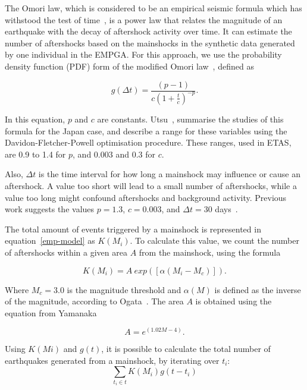 The Omori law, which is considered to be an empirical seismic formula
which has withstood the test of
time~\cite{utsu1995centenary,omori1895after}, is a power law that
relates the magnitude of an earthquake with the decay of aftershock
activity over time. It can estimate the number of aftershocks based on
the mainshocks in the synthetic data generated by one individual in
the EMPGA. For this approach, we use the probability density function
(PDF) form of the modified Omori law~\cite{zhuang2004analyzing},
defined as

\begin{equation}\label{omori}
  g(\Delta t)= \frac{(p-1)}{c(1+ \frac{t}{c})^{-p}}.
\end{equation}

In this equation, $p$ and $c$ are
constants. Utsu~\cite{utsu1995centenary}, summarise the studies of
this formula for the Japan case, and describe a range for these
variables using the Davidon-Fletcher-Powell optimisation
procedure. These ranges, used in ETAS, are 0.9 to 1.4 for $p$, and
0.003 and 0.3 for $c$.

Also, $\Delta t$ is the time interval for how long a mainshock may
influence or cause an aftershock. A value too short will lead to a
small number of aftershocks, while a value too long might confound
aftershocks and background activity. Previous work suggests the values
$p = 1.3$, $c = 0.003$, and $\Delta t = 30$
days~\cite{yamanaka1990scaling}.

The total amount of events triggered by a mainshock is represented in
equation~\ref{emp-model} as $K(M_i)$. To calculate this value,
we count the number of aftershocks within a given area $A$ from
the mainshock, using the formula

\begin{equation}\label{triggered}
 K(M_i) = A\ exp([\alpha(M_i-M_c)]).
\end{equation}

Where $M_c = 3.0$ is the magnitude threshold and $\alpha(M)$ is defined
as the inverse of the magnitude, according to
Ogata~\cite{ogata2006space}. The area $A$ is obtained using the
equation from Yamanaka~\cite{yamanaka1990scaling}

\begin{equation}
A = e^{(1.02M -4)}.
\end{equation}

Using $K(Mi)$ and $g(t)$, it is possible to calculate the total number
of earthquakes generated from a mainshock, by iterating over $t_i$:
\begin{equation}
\displaystyle\sum_{t_i \in t} K(M_i)g(t-t_i)
\end{equation}

